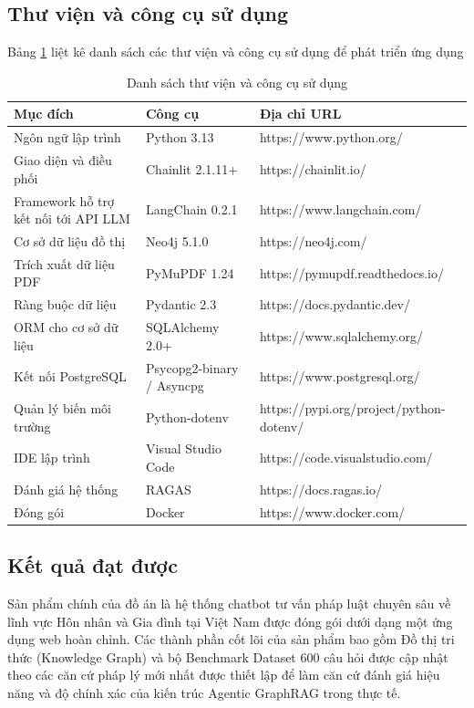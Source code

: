 \documentclass[../DoAn.tex]{subfiles}
\begin{document}
\subsection{Thư viện và công cụ sử dụng}
Bảng \ref{table:my_label} liệt kê danh sách các thư viện và công cụ sử dụng để phát triển ứng dụng
\begin{table}[H]
\centering{}
    \begin{tabular}{|p{5cm}|p{3.5cm}|p{6.5cm}|}
        \hline
        \textbf{Mục đích} & \textbf{Công cụ} & \textbf{Địa chỉ URL} \\ \hline
        Ngôn ngữ lập trình & Python 3.13 & https://www.python.org/ \\ \hline
        Giao diện và điều phối & Chainlit 2.1.11+  & https://chainlit.io/ \\ \hline
        Framework hỗ trợ kết nối tới API LLM & LangChain 0.2.1  & https://www.langchain.com/ \\ \hline
        Cơ sở dữ liệu đồ thị & Neo4j 5.1.0 & https://neo4j.com/ \\ \hline
        Trích xuất dữ liệu PDF & PyMuPDF 1.24 & https://pymupdf.readthedocs.io/ \\ \hline
        Ràng buộc dữ liệu & Pydantic 2.3 & https://docs.pydantic.dev/ \\ \hline
        ORM cho cơ sở dữ liệu & SQLAlchemy 2.0+ & https://www.sqlalchemy.org/ \\ \hline
        Kết nối PostgreSQL & Psycopg2-binary / Asyncpg  & https://www.postgresql.org/ \\ \hline
        Quản lý biến môi trường & Python-dotenv & https://pypi.org/project/python-dotenv/ \\ \hline
        IDE lập trình & Visual Studio Code & https://code.visualstudio.com/ \\ \hline
        Đánh giá hệ thống & RAGAS  & https://docs.ragas.io/ \\ \hline
        Đóng gói & Docker & https://www.docker.com/  \\ \hline
    \end{tabular}
    \caption{Danh sách thư viện và công cụ sử dụng}
    \label{table:my_label}
\end{table}
\subsection{Kết quả đạt được}
\label{subsection:4.7}
Sản phẩm chính của đồ án là hệ thống chatbot tư vấn pháp luật chuyên sâu về lĩnh vực Hôn nhân và Gia đình tại Việt Nam được đóng gói dưới dạng một ứng dụng web hoàn chỉnh. Các thành phần cốt lõi của sản phẩm bao gồm Đồ thị tri thức (Knowledge Graph) và bộ Benchmark Dataset 600 câu hỏi được cập nhật theo các căn cứ pháp lý mới nhất được thiết lập để làm căn cứ đánh giá hiệu năng và độ chính xác của kiến trúc Agentic GraphRAG trong thực tế.
\end{document}
